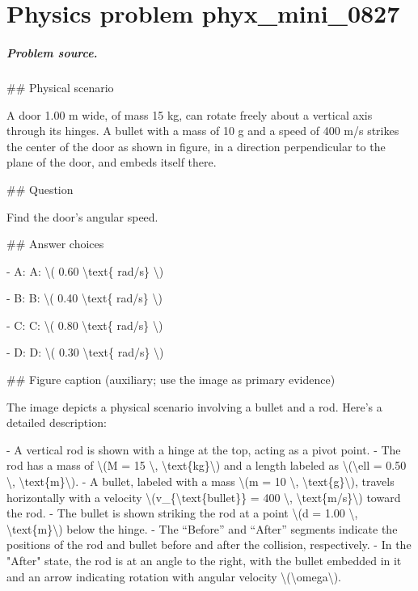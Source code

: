 
\chapter{Physics problem phyx\_mini\_0827}
\label{ch:PhyXMiniProblems_problem_phyx_mini_0827}

\paragraph{Problem source.}
\#\# Physical scenario

A door 1.00 m wide, of mass 15 kg, can rotate freely about a vertical axis through its hinges. A bullet with a mass of 10 g and a speed of 400 m/s strikes the center of the door as shown in figure, in a direction perpendicular to the plane of the door, and embeds itself there.

\#\# Question

Find the door's angular speed.

\#\# Answer choices

- A: A: \textbackslash{}( 0.60 \textbackslash{}text\{ rad/s\} \textbackslash{})

- B: B: \textbackslash{}( 0.40 \textbackslash{}text\{ rad/s\} \textbackslash{})

- C: C: \textbackslash{}( 0.80 \textbackslash{}text\{ rad/s\} \textbackslash{})

- D: D: \textbackslash{}( 0.30 \textbackslash{}text\{ rad/s\} \textbackslash{})

\#\# Figure caption (auxiliary; use the image as primary evidence)

The image depicts a physical scenario involving a bullet and a rod. Here's a detailed description:

- A vertical rod is shown with a hinge at the top, acting as a pivot point.
- The rod has a mass of \textbackslash{}(M = 15 \textbackslash{}, \textbackslash{}text\{kg\}\textbackslash{}) and a length labeled as \textbackslash{}(\textbackslash{}ell = 0.50 \textbackslash{}, \textbackslash{}text\{m\}\textbackslash{}).
- A bullet, labeled with a mass \textbackslash{}(m = 10 \textbackslash{}, \textbackslash{}text\{g\}\textbackslash{}), travels horizontally with a velocity \textbackslash{}(v\_\{\textbackslash{}text\{bullet\}\} = 400 \textbackslash{}, \textbackslash{}text\{m/s\}\textbackslash{}) toward the rod.
- The bullet is shown striking the rod at a point \textbackslash{}(d = 1.00 \textbackslash{}, \textbackslash{}text\{m\}\textbackslash{}) below the hinge.
- The “Before” and “After” segments indicate the positions of the rod and bullet before and after the collision, respectively.
- In the "After" state, the rod is at an angle to the right, with the bullet embedded in it and an arrow indicating rotation with angular velocity \textbackslash{}(\textbackslash{}omega\textbackslash{}).

